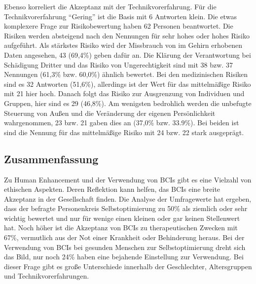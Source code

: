 \documentclass[11pt,ngerman,parskip=half]{scrartcl}
\begin{document}
Ebenso korreliert die Akzeptanz mit der Technikvorerfahrung. Für die
Technikvorerfahrung \enquote{Gering} ist die Basis mit 6 Antworten klein.
Die etwas komplexere Frage zur Risikobewertung haben 62 Personen beantwortet.
Die Risiken werden absteigend nach den Nennungen für sehr hohes oder hohes
Risiko aufgeführt. Als stärkstes Risiko wird der Missbrauch von im Gehirn
erhobenen Daten angesehen, 43 (69,4\%) geben dafür an. Die Klärung der
Verantwortung bei Schädigung Dritter und das Risiko von Ungerechtigkeit sind
mit 38 bzw. 37 Nennungen (61,3\% bzw. 60,0\%) ähnlich bewertet. Bei den
medizinischen Risiken sind es 32 Antworten (51,6\%), allerdings ist der Wert
für das mittelmäßige Risiko mit 21 hier hoch. Danach folgt das Risiko zur
Ausgrenzung von Individuen und Gruppen, hier sind es 29 (46,8\%). Am wenigsten
bedrohlich werden die unbefugte Steuerung von Außen und die Veränderung der
eigenen Persönlichkeit wahrgenommen, 23 bzw. 21 gaben dies an (37,0\% bzw.
33.9\%). Bei beiden ist sind die Nennung für das mittelmäßige Risiko mit 24
bzw. 22 stark ausgeprägt.

\subsection{Zusammenfassung}
\label{subsec:kathrin_zusammenfassung}
Zu Human Enhancement und der Verwendung von BCIs gibt es eine Vielzahl von
ethischen Aspekten. Deren Reflektion kann helfen, das BCIs eine breite
Akzeptanz in der Gesellschaft finden. Die Analyse der Umfragewerte hat
ergeben, dass der befragte Personenkreis Selbstoptimierung zu 50\% als
ziemlich oder sehr wichtig bewertet und nur für wenige einen kleinen oder gar
keinen Stellenwert hat. Noch höher ist die Akzeptanz von BCIs zu
therapeutischen Zwecken mit 67\%, vermutlich aus der Not einer Krankheit oder
Behinderung heraus. Bei der Verwendung von BCIs bei gesunden Menschen zur
Selbstoptimierung dreht sich das Bild, nur noch 24\% haben eine bejahende
Einstellung zur Verwendung. Bei dieser Frage gibt es große Unterschiede
innerhalb der Geschlechter, Altersgruppen und Technikvorerfahrungen.

\newpage
\printbibliography[heading=bibintoc]
\end{document}
